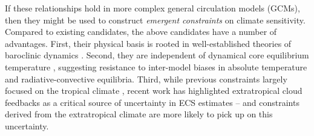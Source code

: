 \documentclass[12pt]{article}
\begin{document}
  If these relationships hold in more complex
  general circulation models (GCMs),
  then they might be used
  to construct \textit{emergent constraints} on climate sensitivity.
  Compared to existing candidates,
  the above candidates have
  a number of advantages.
  First, their physical basis
  is
  rooted in well-established theories of baroclinic dynamics
  \citep{schneider_tropopause_2004,zurita-gotor_sensitivity_2008}.
  Second,
  they
  are independent
  of dynamical core equilibrium temperature
  \citep{davis_relationships_nodate},
  suggesting resistance to inter-model biases
  in absolute temperature and radiative-convective equilibria.
  Third,
  while
  previous constraints largely focused
  on the tropical climate \citet[e.g.,][]{bretherton_combining_2020},
  recent work has highlighted extratropical
  cloud feedbacks as a critical
  source of uncertainty in ECS estimates
  \citet[e.g.,][]{zelinka_causes_2020}
  -- and constraints derived from the extratropical climate
  are more likely to pick up on this uncertainty.
\end{document}

